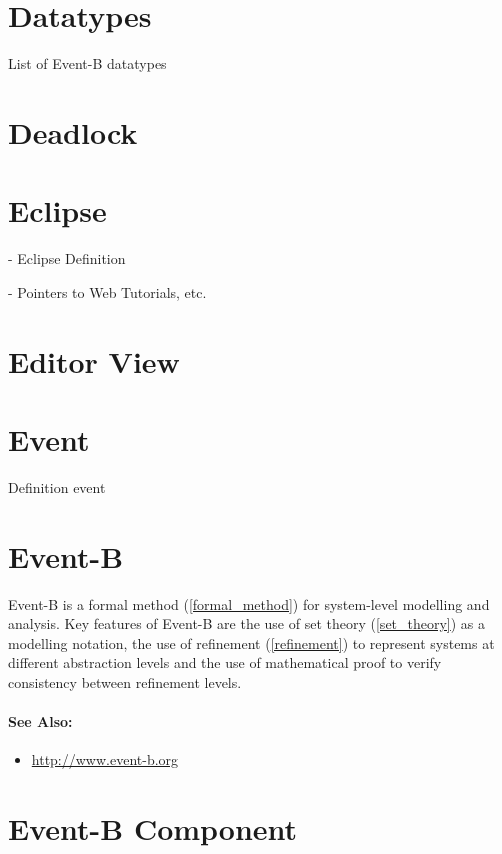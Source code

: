 \section{Datatypes}
\label{datatypes}

List of Event-B datatypes

\section{Deadlock}
\label{deadlock}

\section{Eclipse}
\label{eclipse}

- Eclipse Definition

- Pointers to Web Tutorials, etc.

\section{Editor View}
\label{editor_view}


\section{Event}
\label{event}

Definition event

\section{Event-B}
\label{eventb}

Event-B is a formal method (\ref{formal_method}) for system-level modelling and analysis. Key features of Event-B are the use of set theory (\ref{set_theory}) as a modelling notation, the use of refinement (\ref{refinement}) to represent systems at different abstraction levels and the use of mathematical proof to verify consistency between refinement levels.

\paragraph{See Also:}
\begin{itemize}
\item \url{http://www.event-b.org}
\end{itemize}

\section{Event-B Component}
\label{eventb_component}

